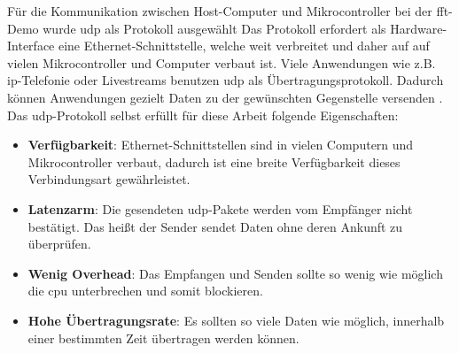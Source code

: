 \documentclass[../EDF Master Thesis.tex]{subfiles}
\begin{document}
    Für die Kommunikation zwischen Host-Computer und Mikrocontroller bei der \ac{fft}-Demo wurde \ac{udp} als Protokoll ausgewählt
    Das Protokoll erfordert als Hardware-Interface eine Ethernet-Schnittstelle, welche weit verbreitet und daher auf auf vielen Mikrocontroller und Computer verbaut ist.
    Viele Anwendungen wie z.B. \ac{ip}-Telefonie oder Livestreams benutzen \ac{udp} als Übertragungsprotokoll.
    Dadurch können Anwendungen gezielt Daten zu der gewünschten Gegenstelle versenden \parencite{elektronik_kompendium}.
    Das \ac{udp}-Protokoll selbst erfüllt für diese Arbeit folgende Eigenschaften:
    \begin{itemize}
        \item \textbf{Verfügbarkeit}: Ethernet-Schnittstellen sind in vielen Computern und Mikrocontroller verbaut, dadurch ist eine breite Verfügbarkeit dieses Verbindungsart gewährleistet.
        \item \textbf{Latenzarm}: Die gesendeten \ac{udp}-Pakete werden vom Empfänger nicht bestätigt. Das heißt der Sender sendet Daten ohne deren Ankunft zu überprüfen.
        \item \textbf{Wenig Overhead}: Das Empfangen und Senden sollte so wenig wie möglich die \ac{cpu} unterbrechen und somit blockieren.
        \item \textbf{Hohe Übertragungsrate}: Es sollten so viele Daten wie möglich, innerhalb einer bestimmten Zeit übertragen werden können.
    \end{itemize}
\end{document}
